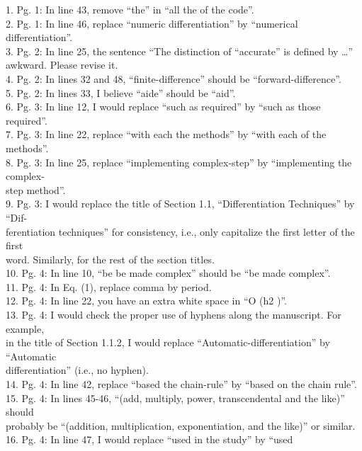 1. Pg. 1: In line 43, remove ``the'' in ``all the of the code''. \\2.
Pg. 1: In line 46, replace ``numeric differentiation'' by ``numerical
differentiation''. \\3. Pg. 2: In line 25, the sentence ``The
distinction of ``accurate'' is deﬁned by \ldots{}'' \\awkward. Please
revise it. \\4. Pg. 2: In lines 32 and 48, ``ﬁnite-difference'' should
be ``forward-difference''. \\5. Pg. 2: In lines 33, I believe ``aide''
should be ``aid''. \\6. Pg. 3: In line 12, I would replace ``such as
required'' by ``such as those required''. \\7. Pg. 3: In line 22,
replace ``with each the methods'' by ``with each of the methods''. \\8.
Pg. 3: In line 25, replace ``implementing complex-step'' by
``implementing the complex- \\step method''. \\9. Pg. 3: I would replace
the title of Section 1.1, ``Differentiation Techniques'' by ``Dif-
\\ferentiation techniques'' for consistency, i.e., only capitalize the
ﬁrst letter of the ﬁrst \\word. Similarly, for the rest of the section
titles. \\10. Pg. 4: In line 10, ``be be made complex'' should be ``be
made complex''. \\11. Pg. 4: In Eq. (1), replace comma by period. \\12.
Pg. 4: In line 22, you have an extra white space in ``O (h2 )''. \\13.
Pg. 4: I would check the proper use of hyphens along the manuscript. For
example, \\in the title of Section 1.1.2, I would replace
``Automatic-differentiation'' by ``Automatic \\differentiation'' (i.e.,
no hyphen). \\14. Pg. 4: In line 42, replace ``based the chain-rule'' by
``based on the chain rule''. \\15. Pg. 4: In lines 45-46, ``(add,
multiply, power, transcendental and the like)'' should \\probably be
``(addition, multiplication, exponentiation, and the like)'' or similar.
\\16. Pg. 4: In line 47, I would replace ``used in the study'' by ``used
